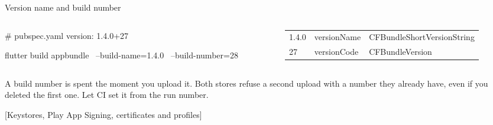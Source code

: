 \documentclass[10pt,aspectratio=169,t]{beamer}
\begin{document}
\begin{frame}[fragile,eyebrow=Building]{Version name and build number}
  \begin{columns}[T]
    \begin{column}{0.44\textwidth}
\begin{yaml}
# pubspec.yaml
version: 1.4.0+27
\end{yaml}
\begin{shell}
flutter build appbundle \
  --build-name=1.4.0 \
  --build-number=28
\end{shell}
    \end{column}
    \begin{column}{0.52\textwidth}
      {\begin{tabular}{@{}lll@{}}
        \toprule
        \thead{Part} & \thead{Android} & \thead{iOS} \\
        \midrule
        1.4.0 & versionName & CFBundleShortVersionString \\
        27 & versionCode & CFBundleVersion \\
        \bottomrule
      \end{tabular}}
      \vskip 3mm
    \end{column}
  \end{columns}
  \begin{takeaway}{A build number is spent the moment you upload it.}
    Both stores refuse a second upload with a number they already have, even if you deleted the first one. Let CI set it from the run number.
  \end{takeaway}
\end{frame}

[Keystores, Play App Signing, certificates and profiles]
\end{document}
